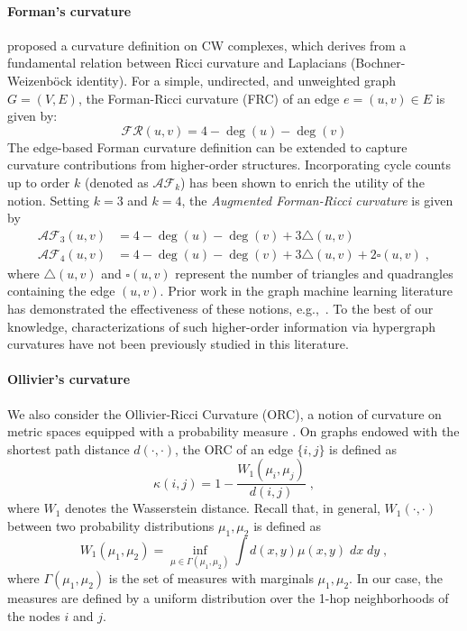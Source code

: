\paragraph{Forman's curvature}
\citet{Forman2003BochnersMF} proposed a curvature definition on CW complexes, which derives from a fundamental relation between Ricci curvature and Laplacians (Bochner-Weizenb{\"o}ck identity). For a simple, undirected, and unweighted graph $G = (V, E)$, the Forman-Ricci curvature (FRC) of an edge $e = (u, v) \in E$ is given by:
\begin{equation*}
    \mathcal{FR} (u,v) = 4 - \deg(u) - \deg(v)
\end{equation*}
The edge-based Forman curvature definition can be extended to capture curvature contributions from higher-order structures. Incorporating cycle counts up to order $k$ (denoted as $\mathcal{AF}_k$) has been shown to enrich the utility of the notion. Setting $k=3$ and $k=4$, the \emph{Augmented Forman-Ricci curvature} is given by
\begin{equation*}
\begin{split}
    \mathcal{AF}_3 (u,v) &= 4 - \deg(u) - \deg(v) + 3 \triangle(u,v)\\
    \mathcal{AF}_4 (u,v) &= 4 - \deg(u) - \deg(v) + 3 \triangle(u,v) + 2 \square(u,v) \; ,
\end{split}
\end{equation*}
where $\triangle(u,v)$ and $\square(u,v)$ represent the number of triangles and quadrangles containing the edge $(u,v)$. Prior work in the graph machine learning literature has demonstrated the effectiveness of these notions, e.g.,~\citep{fesser2024mitigating,fesser2024augmentations}. To the best of our knowledge, characterizations of such higher-order information via hypergraph curvatures have not been previously studied in this literature.


\paragraph{Ollivier's curvature}
We also consider the Ollivier-Ricci Curvature (ORC), a notion of curvature on metric spaces equipped with a probability measure \citep{ollivier2007ricci}. On graphs endowed with the shortest path distance $d(\cdot,\cdot)$, the ORC of an edge $\{i,j\}$ is defined as
\begin{equation} 
\kappa(i,j) = 1 - \frac{W_1(\mu_i, \mu_j)}{d(i,j)} \; ,
\end{equation}
where $W_1$ denotes the Wasserstein distance. Recall that, in general, $W_1(\cdot,\cdot)$ between two probability distributions $\mu_1, \mu_2$ is defined as
\begin{equation}
\label{eq:W-dist}
    W_1(\mu_1, \mu_2) = \inf_{\mu \in \Gamma(\mu_1,\mu_2)} \int d(x,y) \mu(x,y) \; dx \; dy \; ,
\end{equation}
where $\Gamma(\mu_1,\mu_2)$ is the set of measures with marginals $\mu_1,\mu_2$. In our case, the measures are defined by a uniform distribution over the 1-hop neighborhoods of the nodes $i$ and $j$.


